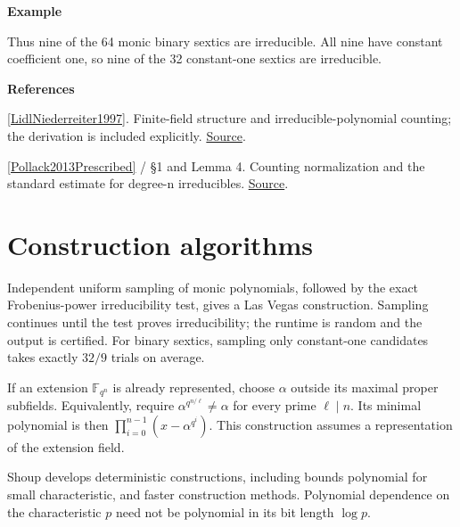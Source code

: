\documentclass[11pt,a4paper,oneside,openany]{book}
\newcommand{\atlasdisplay}[1]{\par\begingroup\centering\vspace{3pt}\noindent\adjustbox{max width=\linewidth}{\(\displaystyle #1\)}\par\vspace{5pt}\endgroup}
\newenvironment{sources}{\par\smallskip\begingroup\footnotesize\color{atlasgray}\leftskip=10pt\setlength{\parskip}{2pt}}{\par\endgroup\smallskip}
\begin{document}
\begin{atlasblock}[standard]
\textbf{\sffamily Example}\par\smallskip

\atlasdisplay{N_2(6)=\frac{64-8-4+2}{6}=9.}
\color{black} Thus nine of the 64 monic binary sextics are irreducible. All nine have constant coefficient one, so nine of the 32 constant-one sextics are irreducible.\par
\end{atlasblock}\color{black}
\begin{sources}
\textbf{References}\par\smallskip
\noindent\hyperlink{ref:LidlNiederreiter1997}{[LidlNiederreiter1997]}. Finite-field structure and irreducible-polynomial counting; the derivation is included explicitly. \href{https://www.cambridge.org/core/books/finite-fields/75BDAA74ABAE713196E718392B9E5E72}{Source}.\par
\noindent\hyperlink{ref:Pollack2013Prescribed}{[Pollack2013Prescribed]} / §1 and Lemma 4. Counting normalization and the standard estimate for degree-n irreducibles. \href{https://www.pollack-math.net/prescribed.pdf}{Source}.\par
\end{sources}\color{black}
\section{Construction algorithms}
\color{black} Independent uniform sampling of monic polynomials, followed by the exact Frobenius-power irreducibility test, gives a Las Vegas construction. Sampling continues until the test proves irreducibility; the runtime is random and the output is certified. For binary sextics, sampling only constant-one candidates takes exactly \(32/9\) trials on average.\par
\color{black} If an extension \(\mathbb F_{q^n}\) is already represented, choose \(\alpha\) outside its maximal proper subfields. Equivalently, require \(\alpha^{q^{n/\ell}}\ne\alpha\) for every prime \(\ell\mid n\). Its minimal polynomial is then \(\prod_{i=0}^{n-1}(x-\alpha^{q^i})\). This construction assumes a representation of the extension field.\par
\color{black} Shoup develops deterministic constructions, including bounds polynomial for small characteristic, and faster construction methods. Polynomial dependence on the characteristic \(p\) need not be polynomial in its bit length \(\log p\).\par
\end{document}
